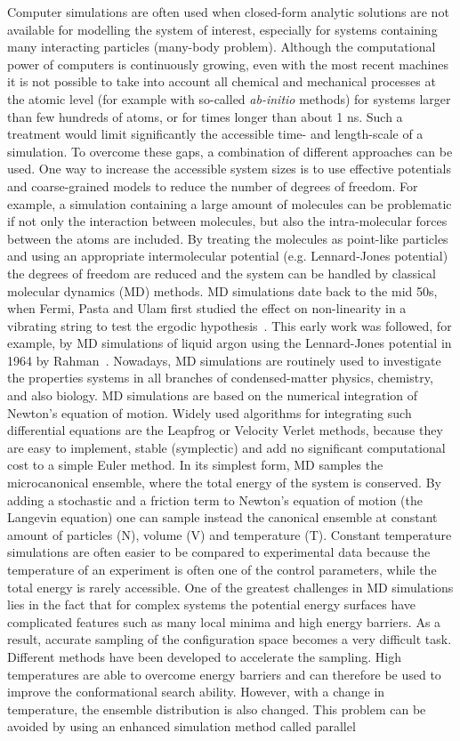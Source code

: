 \documentclass[a4paper]{article}
\begin{document}
Computer simulations are often used when closed-form analytic solutions are not available for modelling the system of interest, especially for systems containing many interacting particles (many-body problem). Although the computational power of computers is continuously growing, even with the most recent machines it is not possible to take into account all chemical and mechanical processes at the atomic level (for example with so-called {\it ab-initio} methods) for systems larger than few hundreds of atoms, or for times longer than about 1 ns. Such a treatment would limit significantly the accessible time- and length-scale of a simulation. To overcome these gaps, a combination of different approaches can be used. One way to increase the accessible system sizes is to use effective potentials and coarse-grained models to reduce the number of degrees of freedom. For example, a simulation containing a large amount of molecules can be problematic if not only the interaction between molecules, but also the intra-molecular forces between the atoms are included. By treating the molecules as point-like particles and using an appropriate intermolecular potential (e.g. Lennard-Jones potential) the degrees of freedom are reduced and the system can be handled by classical molecular dynamics (MD) methods. MD simulations date back to the mid 50s, when Fermi, Pasta and Ulam first studied the effect on non-linearity in a vibrating string to test the ergodic hypothesis~\cite{fermi1955studies}. This early work was followed, for example, by MD simulations of liquid argon using the Lennard-Jones potential in 1964 by Rahman~\cite{rahman1964correlations}. Nowadays, MD simulations are routinely used to investigate the properties systems in all branches of condensed-matter physics, chemistry, and also biology.  MD simulations are based on the numerical integration of Newton's equation of motion. Widely used algorithms for integrating such differential equations are the Leapfrog or Velocity Verlet methods, because they are easy to implement, stable (symplectic) and add no significant computational cost to a simple Euler method. In its simplest form, MD samples the microcanonical ensemble, where the total energy of the system is conserved. By adding a stochastic and a friction term to Newton's equation of motion (the Langevin equation) one can sample instead the canonical ensemble  at constant amount of particles (N), volume (V) and temperature (T). Constant temperature simulations are often easier to be compared to experimental data because the temperature of an experiment is often  one of the  control parameters, while the total energy is rarely accessible. One of the greatest challenges in MD simulations lies in the fact that for complex systems the potential energy surfaces have complicated features such as many local minima  and high energy barriers. As a result, accurate sampling of the configuration space becomes a very difficult task. Different methods have been developed to accelerate the sampling. High temperatures are able to overcome energy barriers and can therefore be used to improve the conformational search ability. However,  with a change in temperature, the ensemble distribution is also changed. This problem can be avoided by using an enhanced simulation method called parallel 
\end{document}
